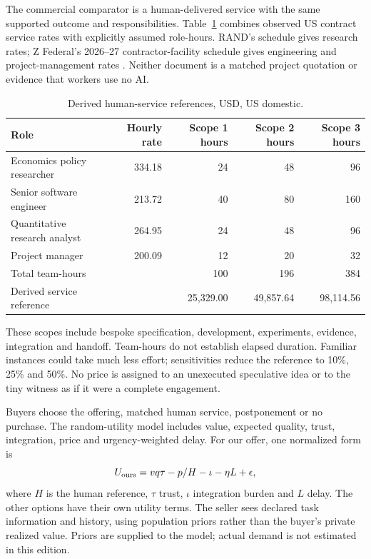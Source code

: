 \documentclass[11pt,letterpaper]{article}
\begin{document}
The commercial comparator is a human-delivered service with the same supported
outcome and responsibilities. Table~\ref{tab:human} combines observed US
contract service rates with explicitly assumed role-hours. RAND's schedule gives
research rates; Z Federal's 2026--27 contractor-facility schedule gives engineering
and project-management rates \citep{rand-rates,zfed-rates}. Neither document is
a matched project quotation or evidence that workers use no AI.

\begin{table}[H]\centering\small
\caption{Derived human-service references, USD, US domestic.}\label{tab:human}
\begin{tabular}{lrrrr}\toprule
Role & Hourly rate & Scope 1 hours & Scope 2 hours & Scope 3 hours\\\midrule
Economics policy researcher & 334.18 & 24 & 48 & 96\\
Senior software engineer & 213.72 & 40 & 80 & 160\\
Quantitative research analyst & 264.95 & 24 & 48 & 96\\
Project manager & 200.09 & 12 & 20 & 32\\\midrule
Total team-hours & & 100 & 196 & 384\\
Derived service reference & & 25,329.00 & 49,857.64 & 98,114.56\\\bottomrule
\end{tabular}
\end{table}

These scopes include bespoke specification, development, experiments, evidence,
integration and handoff. Team-hours do not establish elapsed duration. Familiar
instances could take much less effort; sensitivities reduce the reference to
10\%, 25\% and 50\%. No price is assigned to an unexecuted speculative idea or
to the tiny witness as if it were a complete engagement.

Buyers choose the offering, matched human service, postponement or no purchase.
The random-utility model includes value, expected quality, trust, integration,
price and urgency-weighted delay. For our offer, one normalized form is
\begin{equation}
U_{\rm ours}=v q\tau-p/H-\iota-\eta L+\epsilon,
\end{equation}
where $H$ is the human reference, $\tau$ trust, $\iota$ integration burden and $L$
delay. The other options have their own utility terms. The seller sees declared
task information and history, using population priors rather than the buyer's
private realized value. Priors are supplied to the model; actual demand is not
estimated in this edition.
\end{document}
